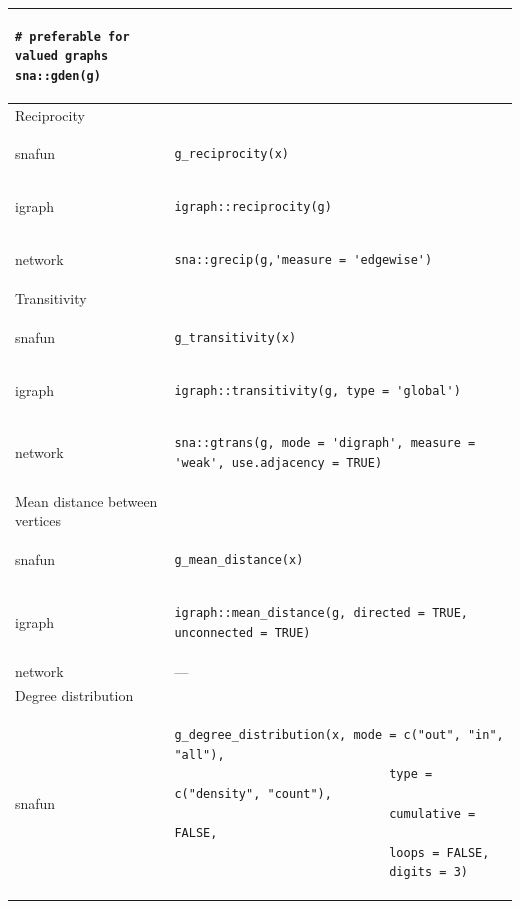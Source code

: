 \documentclass[
]{article}
\begin{document}
\begin{longtable}{ll}
\begin{verbatim}
# preferable for valued graphs
sna::gden(g)
\end{verbatim} \\ 
\midrule
\multicolumn{1}{l}{Reciprocity} \\ 
\midrule
snafun & \begin{verbatim}
g_reciprocity(x)
\end{verbatim} \\ 
igraph & \begin{verbatim}
igraph::reciprocity(g)
\end{verbatim} \\ 
network & \begin{verbatim}
sna::grecip(g,'measure = 'edgewise')
\end{verbatim} \\ 
\midrule
\multicolumn{1}{l}{Transitivity} \\ 
\midrule
snafun & \begin{verbatim}
g_transitivity(x)
\end{verbatim} \\ 
igraph & \begin{verbatim}
igraph::transitivity(g, type = 'global')
\end{verbatim} \\ 
network & \begin{verbatim}
sna::gtrans(g, mode = 'digraph', measure = 'weak', use.adjacency = TRUE)
\end{verbatim} \\ 
\midrule
\multicolumn{1}{l}{Mean distance between vertices} \\ 
\midrule
snafun & \begin{verbatim}
g_mean_distance(x)
\end{verbatim} \\ 
igraph & \begin{verbatim}
igraph::mean_distance(g, directed = TRUE, unconnected = TRUE)
\end{verbatim} \\ 
network & — \\ 
\midrule
\multicolumn{1}{l}{Degree distribution} \\ 
\midrule
snafun & \begin{verbatim}
g_degree_distribution(x, mode = c("out", "in", "all"),
                              type = c("density", "count"),
                              cumulative = FALSE, 
                              loops = FALSE,
                              digits = 3)
\end{verbatim} \\ 

\end{longtable}
\end{document}
